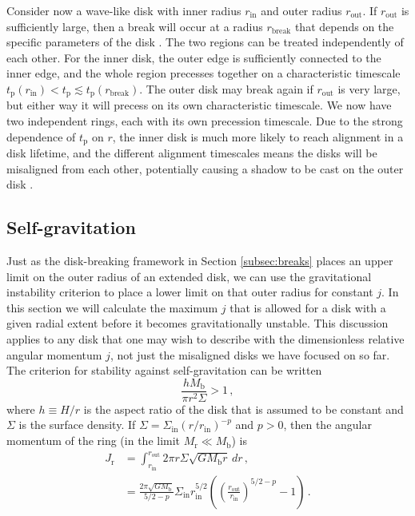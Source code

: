 \documentclass[twocolumn,linenumbers]{aastex631}
\begin{document}
Consider now a wave-like disk with inner radius $r_\text{in}$ and outer radius $r_\text{out}$. If $r_\text{out}$ is sufficiently large, then a break will occur at a radius $r_\text{break}$ that depends on the specific parameters of the disk \citep[see][eq. (9)]{rabago2024}. The two regions can be treated independently of each other. For the inner disk, the outer edge is sufficiently connected to the inner edge, and the whole region precesses together on a characteristic timescale $t_\text{p}(r_\text{in}) < t_\text{p} \lesssim t_\text{p}(r_\text{break})$. The outer disk may break again if $r_\text{out}$ is very large, but either way it will precess on its own characteristic timescale. We now have two independent rings, each with its own precession timescale. Due to the strong dependence of $t_\text{p}$ on $r$, the inner disk is much more likely to reach alignment in a disk lifetime, and the different alignment timescales means the disks will be misaligned from each other, potentially causing a shadow to be cast on the outer disk \citep[see][]{benisty2023,su2024,zhang2024,zhu2024}.

\subsection{Self-gravitation}
\label{subsec:toomre}
Just as the disk-breaking framework in Section \ref{subsec:breaks} places an upper limit on the outer radius of an extended disk, we can use the gravitational instability criterion to place a lower limit on that outer radius for constant $j$. In this section we will calculate the maximum $j$ that is allowed for a disk with a given radial extent before it becomes gravitationally unstable. This discussion applies to any disk that one may wish to describe with the dimensionless relative angular momentum $j$, not just the misaligned disks we have focused on so far. The criterion for stability against self-gravitation \citep{toomre1964} can be written
\begin{equation}
    \label{eq:toomre}
    \frac{hM_\text{b}}{\pi r^2 \Sigma} > 1\, ,
\end{equation}
where $h\equiv H/r$ is the aspect ratio of the disk that is assumed to be constant and $\Sigma$ is the surface density. If $\Sigma = \Sigma_\text{in} (r/r_\text{in})^{-p}$ and $p>0$, then the angular momentum of the ring (in the limit $M_\text{r} \ll M_\text{b}$) is
\begin{align}
    J_\text{r} &= \int_{r_\text{in}}^{r_\text{out}} 2\pi r \Sigma  \sqrt{GM_\text{b}r}\,dr \, , \nonumber \\
    & = \frac{2\pi\sqrt{GM_\text{b}}}{5/2 - p} \Sigma_\text{in} r_\text{in}^{5/2} \left( \left( \frac{r_\text{out}}{r_\text{in}} \right)^{5/2 - p}- 1\right)\, \label{eq:Jr}.
\end{align}
\end{document}
